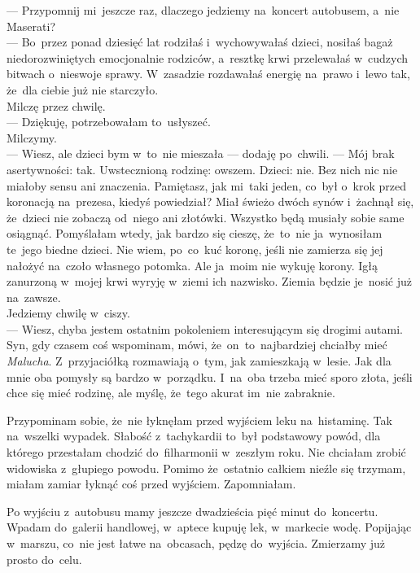 \documentclass[9pt, a5paper]{memoir}
\begin{document}
--- Przypomnij mi~jeszcze raz, dlaczego jedziemy na~koncert autobusem, a~nie Maserati?\\
--- Bo~przez ponad dziesięć lat rodziłaś i~wychowywałaś dzieci, nosiłaś bagaż niedorozwiniętych emocjonalnie rodziców, a~resztkę krwi przelewałaś w~cudzych bitwach o~nieswoje sprawy. W~zasadzie rozdawałaś energię na~prawo i~lewo tak, że~dla ciebie już nie starczyło.\\
Milczę przez chwilę.\\
--- Dziękuję, potrzebowałam to~usłyszeć.\\
Milczymy.\\
--- Wiesz, ale dzieci bym w~to~nie mieszała --- dodaję po~chwili. --- Mój brak asertywności: tak. Uwstecznioną rodzinę: owszem. Dzieci: nie. Bez nich nic nie miałoby sensu ani znaczenia. Pamiętasz, jak mi~taki jeden, co~był o~krok przed koronacją na~prezesa, kiedyś powiedział? Miał świeżo dwóch synów i~żachnął się, że~dzieci nie zobaczą od~niego ani złotówki. Wszystko będą musiały sobie same osiągnąć. Pomyślałam wtedy, jak bardzo się cieszę, że~to~nie ja~wynosiłam te~jego biedne dzieci. Nie wiem, po~co~kuć koronę, jeśli nie zamierza się jej nałożyć na~czoło własnego potomka. Ale ja~moim nie wykuję korony. Igłą zanurzoną w~mojej krwi wyryję w~ziemi ich nazwisko. Ziemia będzie je~nosić już na~zawsze.\\
Jedziemy chwilę w~ciszy.\\
--- Wiesz, chyba jestem ostatnim pokoleniem interesującym się drogimi autami. Syn, gdy czasem coś wspominam, mówi, że~on~to~najbardziej chciałby mieć \textit{Malucha}. Z~przyjaciółką rozmawiają o~tym, jak zamieszkają w~lesie. Jak dla mnie oba pomysły są bardzo w~porządku. I~na~oba trzeba mieć sporo złota, jeśli chce się mieć rodzinę, ale myślę, że~tego akurat im~nie zabraknie.

Przypominam sobie, że~nie łyknęłam przed wyjściem leku na~histaminę. Tak na~wszelki wypadek. Słabość z~tachykardii to~był podstawowy powód, dla którego przestałam chodzić do~filharmonii w~zeszłym roku. Nie chciałam zrobić widowiska z~głupiego powodu. Pomimo że~ostatnio całkiem nieźle się trzymam, miałam zamiar łyknąć coś przed wyjściem. Zapomniałam.

Po wyjściu z~autobusu mamy jeszcze dwadzieścia pięć minut do~koncertu. Wpadam do~galerii handlowej, w~aptece kupuję lek, w~markecie wodę. Popijając w~marszu, co~nie jest łatwe na~obcasach, pędzę do~wyjścia. Zmierzamy już prosto do~celu.
\end{document}
